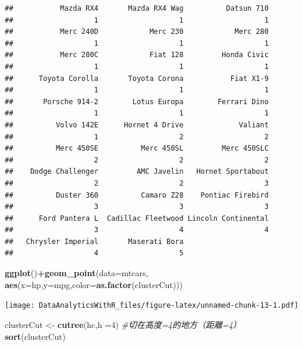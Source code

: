 \documentclass[]{book}
\newenvironment{Shaded}{\begin{snugshade}}{\end{snugshade}}
\newcommand{\CommentTok}[1]{\textcolor[rgb]{0.56,0.35,0.01}{\textit{#1}}}
\newcommand{\DataTypeTok}[1]{\textcolor[rgb]{0.13,0.29,0.53}{#1}}
\newcommand{\DecValTok}[1]{\textcolor[rgb]{0.00,0.00,0.81}{#1}}
\newcommand{\KeywordTok}[1]{\textcolor[rgb]{0.13,0.29,0.53}{\textbf{#1}}}
\newcommand{\NormalTok}[1]{#1}
\newcommand{\OperatorTok}[1]{\textcolor[rgb]{0.81,0.36,0.00}{\textbf{#1}}}
\newcommand{\StringTok}[1]{\textcolor[rgb]{0.31,0.60,0.02}{#1}}
\begin{document}
\begin{verbatim}
##           Mazda RX4       Mazda RX4 Wag          Datsun 710 
##                   1                   1                   1 
##           Merc 240D            Merc 230            Merc 280 
##                   1                   1                   1 
##           Merc 280C            Fiat 128         Honda Civic 
##                   1                   1                   1 
##      Toyota Corolla       Toyota Corona           Fiat X1-9 
##                   1                   1                   1 
##       Porsche 914-2        Lotus Europa        Ferrari Dino 
##                   1                   1                   1 
##          Volvo 142E      Hornet 4 Drive             Valiant 
##                   1                   2                   2 
##          Merc 450SE          Merc 450SL         Merc 450SLC 
##                   2                   2                   2 
##    Dodge Challenger         AMC Javelin   Hornet Sportabout 
##                   2                   2                   3 
##          Duster 360          Camaro Z28    Pontiac Firebird 
##                   3                   3                   3 
##      Ford Pantera L  Cadillac Fleetwood Lincoln Continental 
##                   3                   4                   4 
##   Chrysler Imperial       Maserati Bora 
##                   4                   5
\end{verbatim}

\begin{Shaded}
\begin{Highlighting}[]
\KeywordTok{ggplot}\NormalTok{()}\OperatorTok{+}\KeywordTok{geom_point}\NormalTok{(}\DataTypeTok{data=}\NormalTok{mtcars,}
                    \KeywordTok{aes}\NormalTok{(}\DataTypeTok{x=}\NormalTok{hp,}\DataTypeTok{y=}\NormalTok{mpg,}\DataTypeTok{color=}\KeywordTok{as.factor}\NormalTok{(clusterCut)))}
\end{Highlighting}
\end{Shaded}

\texttt{[image: DataAnalyticsWithR\_files/figure-latex/unnamed-chunk-13-1.pdf]}

\begin{Shaded}
\begin{Highlighting}[]
\NormalTok{clusterCut <-}\StringTok{ }\KeywordTok{cutree}\NormalTok{(hc,}\DataTypeTok{h =}\DecValTok{4}\NormalTok{) }\CommentTok{#切在高度=4的地方（距離=4）}
\KeywordTok{sort}\NormalTok{(clusterCut)}
\end{Highlighting}
\end{Shaded}
\end{document}
